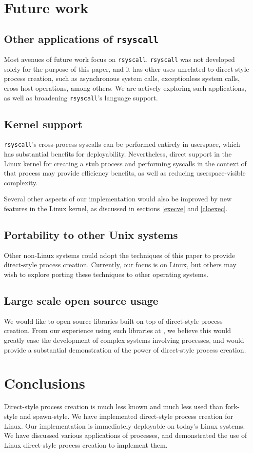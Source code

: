 \documentclass[letterpaper,twocolumn,10pt]{article}
\begin{document}
\section{Future work}\label{future_work}
\subsection{Other applications of \texttt{rsyscall}}
Most avenues of future work focus on \texttt{rsyscall}.
\texttt{rsyscall} was not developed solely for the purpose of this paper,
and it has other uses unrelated to direct-style process creation,
such as asynchronous system calls, exceptionless system calls\cite{flexsc}, cross-host operations, among others.
We are actively exploring such applications,
as well as broadening \texttt{rsyscall}'s language support.
\subsection{Kernel support}
\texttt{rsyscall}'s cross-process syscalls can be performed entirely in userspace,
which has substantial benefits for deployability.
Nevertheless, direct support in the Linux kernel
for creating a stub process and performing syscalls in the context of that process
may provide efficiency benefits, as well as reducing userspace-visible complexity.

Several other aspects of our implementation would also be improved by new features in the Linux kernel,
as discussed in sections \ref{execve} and \ref{cloexec}.
\subsection{Portability to other Unix systems}
Other non-Linux systems
could adopt the techniques of this paper
to provide direct-style process creation.
Currently, our focus is on Linux,
but others may wish to explore porting these techniques to other operating systems.
\subsection{Large scale open source usage}
We would like to open source libraries built on top of direct-style process creation.
From our experience using such libraries at \twosigma,
we believe this would greatly ease the development of complex systems involving processes,
and would provide a substantial demonstration of the power of direct-style process creation.
\section{Conclusions}\label{conclusions}
Direct-style process creation is much less known and much less used than fork-style and spawn-style.
We have implemented direct-style process creation for Linux.
Our implementation is immediately deployable on today's Linux systems.
We have discussed various applications of processes,
and demonstrated the use of Linux direct-style process creation
to implement them.
\end{document}
